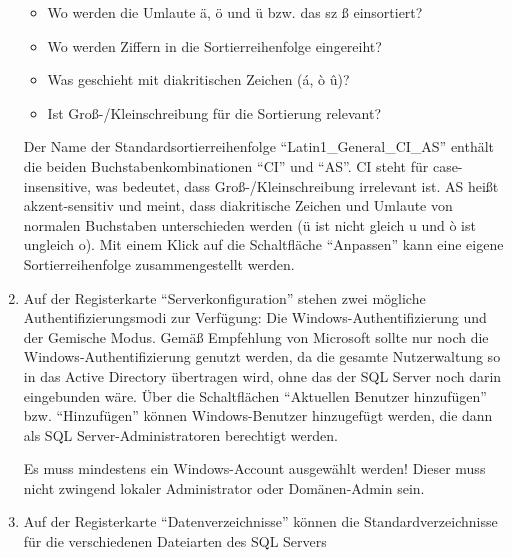 \begin{enumerate}
\begin{itemize}
              \item Wo werden die Umlaute ä, ö und ü bzw. das sz ß einsortiert?
              \item Wo werden Ziffern in die Sortierreihenfolge eingereiht?
              \item Was geschieht mit diakritischen Zeichen (\'{a}, \`{o}
              \^{u})?
              \item Ist Groß-/Kleinschreibung für die Sortierung relevant?
          \end{itemize}
          Der Name der Standardsortierreihenfolge
          \enquote{Latin1\_General\_CI\_AS} enthält die
          beiden Buchstabenkombinationen \enquote{CI} und \enquote{AS}. CI steht
          für case-insensitive, was bedeutet, dass Groß-/Kleinschreibung irrelevant ist. AS heißt        
          akzent-sensitiv und meint, dass diakritische Zeichen und Umlaute von
          normalen Buchstaben unterschieden werden (ü ist nicht gleich u und \`{o}
          ist ungleich o).
          Mit einem Klick auf die Schaltfläche \enquote{Anpassen} kann eine eigene
          Sortierreihenfolge zusammengestellt werden.
          \item Auf der Registerkarte \enquote{Serverkonfiguration} stehen zwei
          mögliche Authentifizierungsmodi zur Verfügung: Die
          Windows-Authentifizierung und der Gemische Modus. Gemäß Empfehlung von
          Microsoft sollte nur noch die Windows-Authentifizierung genutzt werden,
          da die gesamte Nutzerwaltung so in das Active Directory übertragen wird,
          ohne das der SQL Server noch darin eingebunden wäre. Über die
          Schaltflächen \enquote{Aktuellen Benutzer hinzufügen} bzw.
          \enquote{Hinzufügen} können Windows-Benutzer hinzugefügt werden, die
          dann als SQL Server-Administratoren berechtigt werden.
\clearpage
          \begin{merke}
            Es muss mindestens ein Windows-Account ausgewählt werden! Dieser muss
            nicht zwingend lokaler Administrator oder Domänen-Admin sein.
          \end{merke}
          \item Auf der Registerkarte \enquote{Datenverzeichnisse} können die
          Standardverzeichnisse für die verschiedenen Dateiarten des SQL Servers

\end{enumerate}

